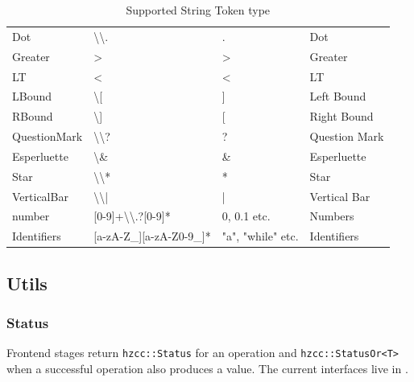 \documentclass{report}
\newcommand{\+}{}
\begin{document}
\begin{table}[hb!]
\begin{tabular}{l|lll}
            Dot          & \textbackslash{}\textbackslash{}.                      & .                 & Dot            \\
            Greater      & \textgreater{}                                         & \textgreater{}    & Greater        \\
            LT         & \textless{}                                            & \textless{}       & LT           \\
            LBound       & \textbackslash{}[                                      & {]}               & Left Bound     \\
            RBound       & \textbackslash{}]                                      & {[}               & Right Bound    \\
            QuestionMark & \textbackslash{}\textbackslash{}?                      & ?                 & Question Mark  \\
            Esperluette  & \textbackslash{}\&                                     & \&                & Esperluette    \\
            Star         & \textbackslash{}\textbackslash{}*                      & *                 & Star           \\
            VerticalBar  & \textbackslash{}\textbackslash{}|                      & |                 & Vertical Bar   \\
            number       & {[}0-9{]}+\textbackslash{}\textbackslash{}.?{[}0-9{]}* & 0, 0.1 etc.       & Numbers        \\
            Identifiers  & {[}a-zA-Z\_{]}{[}a-zA-Z0-9\_{]}*                       & "a", "while" etc. & Identifiers    \\ \hline
        \end{tabular}
        \caption{Supported String Token type}
        \label{tab:supported_lexical_token_list}
    \end{table}

    \subsection{Utils}\label{subsec:utils}

    \subsubsection{Status }
    Frontend stages return \verb|hzcc::Status| for an operation and
    \verb|hzcc::StatusOr<T>| when a successful operation also produces a value.
    The current interfaces live in .
\end{document}
